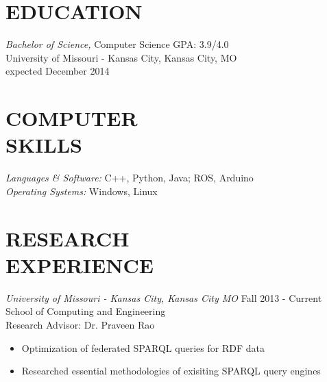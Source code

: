 \documentclass[line,margin]{res}
\begin{document}
\address{\hfill (913)235-1070 \textbar \textbar \hspace{1 mm}  victoria.chen.wu@gmail.com \textbar \textbar \hspace{1 mm} github.com/vptarmigan} 

 
\begin{resume}
 
\section{EDUCATION} {\sl Bachelor of Science,} Computer Science	\hfill GPA: 3.9/4.0\\
                University of Missouri - Kansas City, Kansas City, MO \\
                expected December 2014 
\section{COMPUTER \\ SKILLS} {\sl Languages \& Software:} 
		C++, Python, Java; ROS, Arduino \\
                {\sl Operating Systems:} Windows, Linux 
\section {RESEARCH \\ EXPERIENCE}
		{\sl University of Missouri - Kansas City, Kansas City MO} \hfill Fall 2013 - Current \\
		School of Computing and Engineering \\
		Research Advisor: Dr. Praveen Rao
		 \begin{itemize} [leftmargin=5mm]  \itemsep -2pt %
		 \item  Optimization of federated SPARQL queries for RDF data
		\item   Researched essential methodologies of exisiting SPARQL query engines 
		\end{itemize}



\end{resume}
\end{document}
